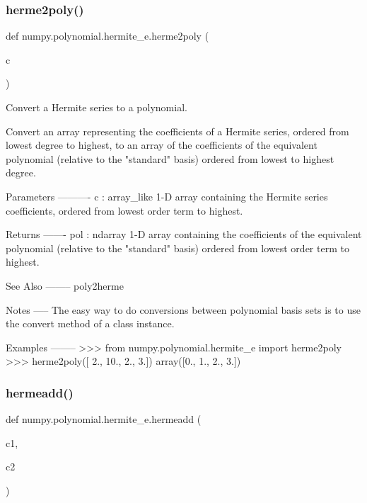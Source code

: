 \subsubsection{\texorpdfstring{herme2poly()}{herme2poly()}}
{\footnotesize\ttfamily def numpy.\+polynomial.\+hermite\+\_\+e.\+herme2poly (\begin{DoxyParamCaption}\item[{}]{c }\end{DoxyParamCaption})}

\begin{DoxyVerb}Convert a Hermite series to a polynomial.

Convert an array representing the coefficients of a Hermite series,
ordered from lowest degree to highest, to an array of the coefficients
of the equivalent polynomial (relative to the "standard" basis) ordered
from lowest to highest degree.

Parameters
----------
c : array_like
    1-D array containing the Hermite series coefficients, ordered
    from lowest order term to highest.

Returns
-------
pol : ndarray
    1-D array containing the coefficients of the equivalent polynomial
    (relative to the "standard" basis) ordered from lowest order term
    to highest.

See Also
--------
poly2herme

Notes
-----
The easy way to do conversions between polynomial basis sets
is to use the convert method of a class instance.

Examples
--------
>>> from numpy.polynomial.hermite_e import herme2poly
>>> herme2poly([  2.,  10.,   2.,   3.])
array([0.,  1.,  2.,  3.])\end{DoxyVerb}
 \mbox{\label{namespacenumpy_1_1polynomial_1_1hermite__e_a75aa83392bc7ebb2307c9151784b91d6}} 
\subsubsection{\texorpdfstring{hermeadd()}{hermeadd()}}
{\footnotesize\ttfamily def numpy.\+polynomial.\+hermite\+\_\+e.\+hermeadd (\begin{DoxyParamCaption}\item[{}]{c1,  }\item[{}]{c2 }\end{DoxyParamCaption})}


